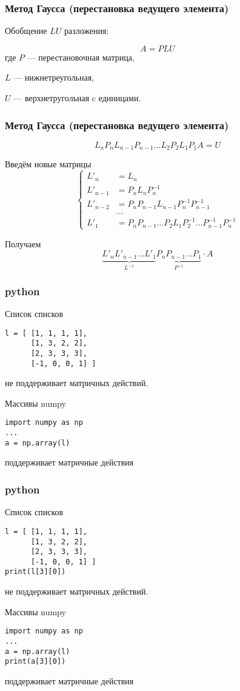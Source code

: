 \documentclass[10pt]{beamer}
\begin{document}
\begin{frame}[fragile]
\frametitle{Метод Гаусса (перестановка ведущего элемента)}
Обобщение $LU$ разложения: 

$$A = PLU$$
где 
$P$ --- перестановочная матрица, 

$L$ --- нижнетреугольная, 

$U$ --- верхнетругольная c единицами.

\end{frame}


\begin{frame}[fragile]
\frametitle{Метод Гаусса (перестановка ведущего элемента)}

$$L_nP_nL_{n-1}P_{n-1}\ldots L_2P_2L_1P_1 A = U$$

Введём новые матрицы
$$
\begin{cases}
L'_n &= L_n\\
L'_{n-1} &= P_nL_nP_{n}^{-1}\\
L'_{n-2} &= P_nP_{n-1}L_{n-1}P_n^{-1}P_{n-1}^{-1}\\
&\ldots\\
L'_1 &= P_nP_{n-1}\ldots P_2L_1P_2^{-1}\ldots P_{n-1}^{-1}P_n^{-1}
\end{cases}
$$

Получаем
$$\underbrace{L'_nL'_{n-1}\ldots L'_1}_{L^{-1}}\underbrace{P_nP_{n-1}\ldots P_1}_{P^{-1}}\cdot A$$
\end{frame}

\begin{frame}[fragile]
\frametitle{python}

Список списков
\begin{lstlisting}
l = [ [1, 1, 1, 1],
      [1, 3, 2, 2],
      [2, 3, 3, 3],
      [-1, 0, 0, 1] ]
\end{lstlisting}
не поддерживает матричных действий.

Массивы numpy
\begin{lstlisting}
import numpy as np
...
a = np.array(l)
\end{lstlisting}
поддерживает матричные действия

\end{frame}


\begin{frame}[fragile]
\frametitle{python}

Список списков
\begin{lstlisting}
l = [ [1, 1, 1, 1],
      [1, 3, 2, 2],
      [2, 3, 3, 3],
      [-1, 0, 0, 1] ]
print(l[3][0])
\end{lstlisting}
не поддерживает матричных действий.

Массивы numpy
\begin{lstlisting}
import numpy as np
...
a = np.array(l)
print(a[3][0])
\end{lstlisting}
поддерживает матричные действия

\end{frame}
\end{document}
